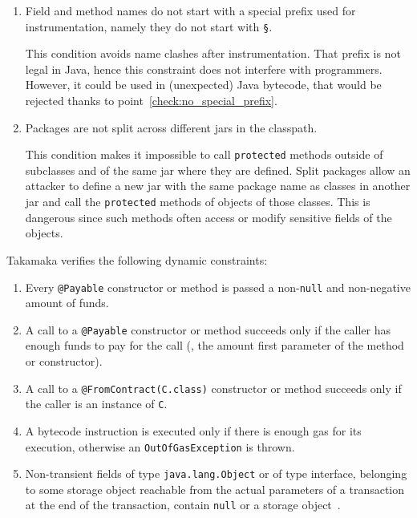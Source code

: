 \begin{enumerate}
%
\item\label{check:no_special_prefix} Field and method names do not start with a special prefix used
    for instrumentation, namely they do not start with \texttt{§}.
%
\begin{commentbox}
This condition avoids name clashes after instrumentation.
That prefix is not legal in Java, hence this constraint
does not interfere with programmers. However, it could be used
in (unexpected) Java bytecode, that would be rejected thanks to point~\ref{check:no_special_prefix}.
\end{commentbox}
%
\item Packages are not split across different jars in the classpath.
%
\begin{commentbox}
This condition makes it impossible to call \texttt{protected} methods
outside of subclasses and of the same jar where they are defined.
Split packages allow an attacker to define a new jar
with the same package name as classes in another jar and
call the \texttt{protected} methods of objects of those classes.
This is dangerous since such methods
often access or modify sensitive fields of the objects.
\end{commentbox}
%
\end{enumerate}

Takamaka verifies the following dynamic constraints:
%
\begin{enumerate}
\item Every \texttt{@Payable}  constructor or method is passed a non-\texttt{null} and
   non-negative amount of funds.
\item A call to a \texttt{@Payable} constructor or method succeeds only if the caller
   has enough funds to pay for the call (\ie, the amount first parameter of
   the method or constructor).
\item A call to a \texttt{@FromContract(C.class)} constructor or method succeeds only if
   the caller is an instance of \texttt{C}.
\item A bytecode instruction is executed only if there is enough gas for
   its execution, otherwise an \texttt{OutOfGasException} is thrown.
\item Non-transient fields of type \texttt{java.lang.Object} or of type interface,
   belonging to some storage object reachable from the actual parameters of a transaction
   at the end of the transaction, contain \texttt{null} or a storage
   object~\label{check:object_or_interface_fields}.
\end{enumerate}

